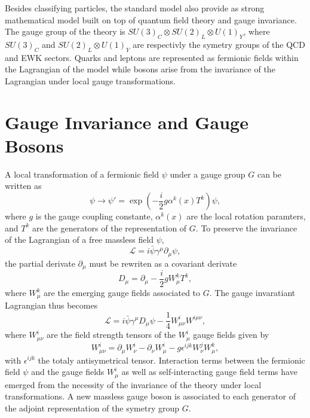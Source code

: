   Besides classifying particles, the standard model also provide as strong mathematical model built on top of quantum field theory and gauge invariance. The gauge group of the theory is $ SU(3)_C \otimes SU(2)_L \otimes U(1)_Y $, where $ SU(3)_C $ and $ SU(2)_L \otimes U(1)_Y $ are respectivly the symetry groups of the QCD and EWK sectors. Quarks and leptons are represented as fermionic fields within the Lagrangian of the model while bosons arise from the invariance of the Lagrangian under local gauge transformations. \\

  \section{Gauge Invariance and Gauge Bosons}

    A local transformation of a fermionic field $ \psi $ under a gauge group $ G $  can be written as
    \begin{equation}
      \psi \rightarrow \psi' = \exp\left(- \frac{i}{2} g \alpha^k(x) T^k \right) \psi ,
    \end{equation}
    where $ g $ is the gauge coupling constante, $ \alpha^k(x) $ are the local rotation paramters, and $ T^k $ are the generators of the representation of $ G $. To preserve the invariance of the Lagrangian of a free massless field $ \psi $,
    \begin{equation}
      \mathcal{L} = i \bar{\psi} \gamma^\mu \partial_\mu \psi ,
    \end{equation}
    the partial derivate $ \partial_\mu $ must be rewriten as a covariant derivate
    \begin{equation}
      D_\mu = \partial_\mu - \frac{i}{2} g W^k_\mu T^k ,
    \end{equation}
    where $ W^k_\mu $ are the emerging gauge fields associated to $ G $. The gauge invaratiant Lagrangian thus becomes
    \begin{equation}
      \mathcal{L} = i \bar{\psi} \gamma^\mu D_\mu \psi - \frac{1}{4} W^i_{\mu \nu} W^{i \mu \nu} ,
    \end{equation}
    where $ W^i_{\mu \nu} $ are the field strength tensors of the $ W^i_\mu $ gauge fields given by
    \begin{equation}
      W^i_{\mu \nu} = \partial_\mu W^i_\nu - \partial_\nu W^i_\mu - g \epsilon^{ijk} W^j_\nu W^k_\mu ,
    \end{equation}
    with $ \epsilon^{ijk} $ the totaly antisymetrical tensor. Interaction terms between the fermionic field $ \psi $ and the gauge fields $ W^i_\mu $ as well as self-interacting gauge field terms have emerged from the necessity of the invariance of the theory under local transformations. A new massless gauge boson is associated to each generator of the adjoint representation of the symetry group $ G $.

